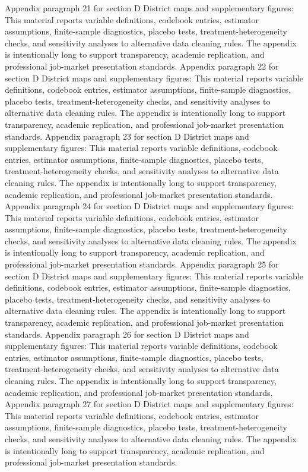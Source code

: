 \documentclass[preprint,12pt]{elsarticle}
\begin{document}
Appendix paragraph 21 for section D District maps and supplementary figures: This material reports variable definitions, codebook entries, estimator assumptions, finite-sample diagnostics, placebo tests, treatment-heterogeneity checks, and sensitivity analyses to alternative data cleaning rules. The appendix is intentionally long to support transparency, academic replication, and professional job-market presentation standards.
Appendix paragraph 22 for section D District maps and supplementary figures: This material reports variable definitions, codebook entries, estimator assumptions, finite-sample diagnostics, placebo tests, treatment-heterogeneity checks, and sensitivity analyses to alternative data cleaning rules. The appendix is intentionally long to support transparency, academic replication, and professional job-market presentation standards.
Appendix paragraph 23 for section D District maps and supplementary figures: This material reports variable definitions, codebook entries, estimator assumptions, finite-sample diagnostics, placebo tests, treatment-heterogeneity checks, and sensitivity analyses to alternative data cleaning rules. The appendix is intentionally long to support transparency, academic replication, and professional job-market presentation standards.
Appendix paragraph 24 for section D District maps and supplementary figures: This material reports variable definitions, codebook entries, estimator assumptions, finite-sample diagnostics, placebo tests, treatment-heterogeneity checks, and sensitivity analyses to alternative data cleaning rules. The appendix is intentionally long to support transparency, academic replication, and professional job-market presentation standards.
Appendix paragraph 25 for section D District maps and supplementary figures: This material reports variable definitions, codebook entries, estimator assumptions, finite-sample diagnostics, placebo tests, treatment-heterogeneity checks, and sensitivity analyses to alternative data cleaning rules. The appendix is intentionally long to support transparency, academic replication, and professional job-market presentation standards.
Appendix paragraph 26 for section D District maps and supplementary figures: This material reports variable definitions, codebook entries, estimator assumptions, finite-sample diagnostics, placebo tests, treatment-heterogeneity checks, and sensitivity analyses to alternative data cleaning rules. The appendix is intentionally long to support transparency, academic replication, and professional job-market presentation standards.
Appendix paragraph 27 for section D District maps and supplementary figures: This material reports variable definitions, codebook entries, estimator assumptions, finite-sample diagnostics, placebo tests, treatment-heterogeneity checks, and sensitivity analyses to alternative data cleaning rules. The appendix is intentionally long to support transparency, academic replication, and professional job-market presentation standards.
\end{document}
